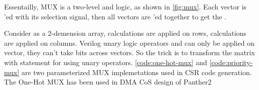 \documentclass[10pt,oneside]{book}
\begin{document}
Essentailly, MUX is a two-level  and  logic, as 
shown in \autoref{fig:mux}. Each  vector is 'ed
with its selection signal, then all  vectors are 'ed
together to get the . 


Consider  as a 2-demension array,  calculations
are applied on rows,  calculations are applied on columns. 
Verilog unary logic operators \mhdl{&} and \mhdl{|} can only be
applied on vector, they can't take bits across vectors. So the trick
is to transform the matrix with  statement for using
unary operators. \autoref{code:one-hot-mux} and 
\autoref{code:priority-mux} are two parameterized MUX implemetations
used in CSR code generation. The One-Hot MUX has been used in DMA
CoS design of Panther2




\end{document}
